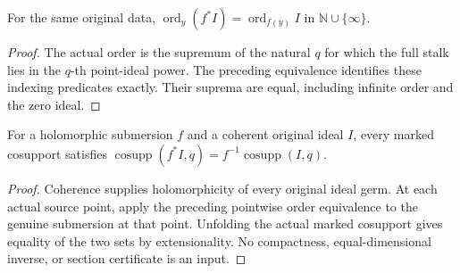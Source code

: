 \begin{theorem}\label{hir:submersion-order}
For the same original data,
$\operatorname{ord}_y(f^*I)=\operatorname{ord}_{f(y)} I$ in
$\mathbb N\cup\{\infty\}$.
\leanok
{}
\end{theorem}
\begin{proof}
The actual order is the supremum of the natural $q$ for which the full
stalk lies in the $q$-th point-ideal power. The preceding equivalence
identifies these indexing predicates exactly. Their suprema are equal,
including infinite order and the zero ideal.
\end{proof}

\begin{theorem}\label{hir:submersion-cosupport}
For a holomorphic submersion $f$ and a coherent original ideal $I$, every
marked cosupport satisfies
$\operatorname{cosupp}(f^*I,q)=f^{-1}\operatorname{cosupp}(I,q)$.
\leanok
{}
\end{theorem}
\begin{proof}
Coherence supplies holomorphicity of every original ideal germ.
At each actual source point, apply the preceding pointwise order
equivalence to the genuine submersion at that point. Unfolding the
actual marked cosupport gives equality of the two sets by extensionality.
No compactness, equal-dimensional inverse, or section certificate is an input.
\end{proof}
